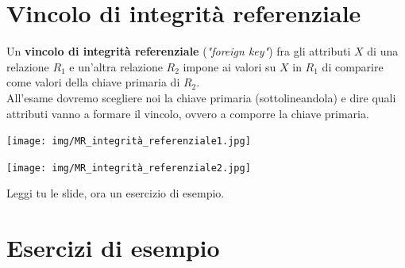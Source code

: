 \section{Vincolo di integrità referenziale}
Un \textbf{vincolo di integrità referenziale} (\textit{"foreign key"}) fra gli attributi $X$ di una relazione $R_1$ e un'altra relazione $R_2$ impone ai valori su $X$ in $R_1$ di comparire come valori della chiave primaria di $R_2$.
\\All'esame dovremo scegliere noi la chiave primaria (sottolineandola) e dire quali attributi vanno a formare il vincolo, ovvero a comporre la chiave primaria.
\begin{center}
    \texttt{[image: img/MR\_integrità\_referenziale1.jpg]}
\end{center}
\begin{center}
    \texttt{[image: img/MR\_integrità\_referenziale2.jpg]}
\end{center}
Leggi tu le slide, ora un esercizio di esempio.

\section{Esercizi di esempio}
